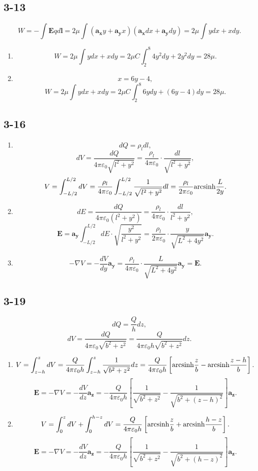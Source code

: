 \documentclass[6pt,a4paper]{article}
\begin{document}
\subsection{3-13}
$$W=-\int\mathbf{E}qd\mathbf{l}=2\mu \int(\mathbf{a_x}y+\mathbf{a_y}x)(\mathbf{a_x}dx+\mathbf{a_y}dy)=2\mu \int ydx+xdy.$$
\begin{enumerate}[label=\alph*)]
\item 
$$W=2\mu \int ydx+xdy=2\mu C\int_2^8 4y^2dy+2y^2dy=28\mu.$$
\item 
$$x=6y-4,$$
$$W=2\mu \int ydx+xdy=2\mu C\int_2^8 6ydy+(6y-4)dy=28\mu.$$
\end{enumerate}

\subsection{3-16}
\begin{enumerate}[label=\alph*)]
\item 
$$dQ=\rho_l dl,$$
$$dV=\frac{dQ}{4\pi\varepsilon_0\sqrt{l^2+y^2}}=\frac{\rho_l}{4\pi\varepsilon_0}\cdot\frac{dl}{\sqrt{l^2+y^2}},$$
$$V=\int_{-L/2}^{L/2}dV=\frac{\rho_l}{4\pi\varepsilon_0}\int_{-L/2}^{L/2}\frac{1}{\sqrt{l^2+y^2}} dl=\frac{\rho_l}{2\pi\varepsilon_0}{\rm arcsinh}\frac{L}{2y}.$$
\item
$$dE=\frac{dQ}{4\pi\varepsilon_0(l^2+y^2)}=\frac{\rho_l}{4\pi\varepsilon_0}\cdot\frac{dl}{l^2+y^2},$$
$$\mathbf{E}=\mathbf{a_y}\int_{-L/2}^{L/2}dE\cdot\sqrt{\frac{y^2}{l^2+y^2}}=\frac{\rho_l}{2\pi\varepsilon_0}\cdot\frac{y}{\sqrt{L^2+4y^2}}\mathbf{a_y}.$$
\item
$$-\nabla V=-\frac{dV}{dy}\mathbf{a_y}=\frac{\rho_l}{4\pi\varepsilon_0}\cdot\frac{L}{\sqrt{L^2+4y^2}}\mathbf{a_y}=\mathbf{E}.$$
\end{enumerate}

\subsection{3-19}
$$dQ=\frac{Q}{h} dz,$$
$$dV=\frac{dQ}{4\pi\varepsilon_0\sqrt{b^2+z^2}}=\frac{Q}{4\pi\varepsilon_0h\sqrt{b^2+z^2}}dz.$$
\begin{enumerate}[label=\alph*)]
\item 
$$V=\int_{z-h}^zdV=\frac{Q}{4\pi\varepsilon_0h}\int_{z-h}^z\frac{1}{\sqrt{b^2+z^2}}dz=\frac{Q}{4\pi\varepsilon_0h}\left[{\rm arcsinh}\frac{z}{b}-{\rm arcsinh}\frac{z-h}{b}\right].$$
$$\mathbf{E}=-\nabla V=-\frac{dV}{dz}\mathbf{a_z}=-\frac{Q}{4\pi\varepsilon_0h}\left[\frac{1}{\sqrt{b^2+z^2}}-\frac{1}{\sqrt{b^2+(z-h)^2}}\right]\mathbf{a_z}.$$
\item
$$V=\int_0^zdV+\int_0^{h-z}dV=\frac{Q}{4\pi\varepsilon_0h}\left[{\rm arcsinh}\frac{z}{b}+{\rm arcsinh}\frac{h-z}{b}\right].$$
$$\mathbf{E}=-\nabla V=-\frac{dV}{dz}\mathbf{a_z}=-\frac{Q}{4\pi\varepsilon_0h}\left[\frac{1}{\sqrt{b^2+z^2}}-\frac{1}{\sqrt{b^2+(h-z)^2}}\right]\mathbf{a_z}.$$
\end{enumerate}
\end{document}
